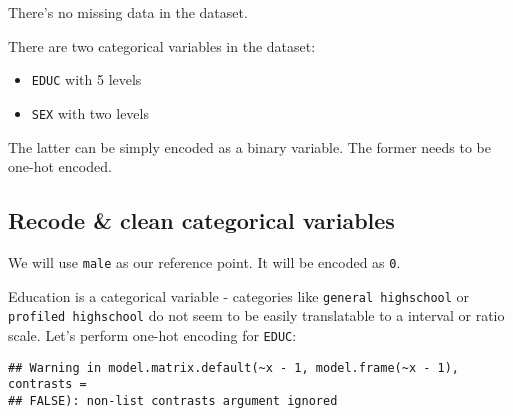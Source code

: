 \documentclass[]{article}
\newenvironment{Shaded}{\begin{snugshade}}{\end{snugshade}}
\newcommand{\CommentTok}[1]{\textcolor[rgb]{0.56,0.35,0.01}{\textit{#1}}}
\newcommand{\DataTypeTok}[1]{\textcolor[rgb]{0.13,0.29,0.53}{#1}}
\newcommand{\DecValTok}[1]{\textcolor[rgb]{0.00,0.00,0.81}{#1}}
\newcommand{\KeywordTok}[1]{\textcolor[rgb]{0.13,0.29,0.53}{\textbf{#1}}}
\newcommand{\NormalTok}[1]{#1}
\newcommand{\OperatorTok}[1]{\textcolor[rgb]{0.81,0.36,0.00}{\textbf{#1}}}
\newcommand{\StringTok}[1]{\textcolor[rgb]{0.31,0.60,0.02}{#1}}
\begin{document}
There's no missing data in the dataset.

There are two categorical variables in the dataset:

\begin{itemize}
\item
  \texttt{EDUC} with 5 levels
\item
  \texttt{SEX} with two levels
\end{itemize}

The latter can be simply encoded as a binary variable. The former needs
to be one-hot encoded.

\hypertarget{recode-clean-categorical-variables}{%
\subsection{Recode \& clean categorical
variables}\label{recode-clean-categorical-variables}}

We will use \texttt{male} as our reference point. It will be encoded as
\texttt{0}.

\begin{Shaded}
\end{Shaded}

Education is a categorical variable - categories like
\texttt{general\ highschool} or \texttt{profiled\ highschool} do not
seem to be easily translatable to a interval or ratio scale. Let's
perform one-hot encoding for \texttt{EDUC}:

\begin{Shaded}
\end{Shaded}

\begin{verbatim}
## Warning in model.matrix.default(~x - 1, model.frame(~x - 1), contrasts =
## FALSE): non-list contrasts argument ignored
\end{verbatim}
\end{document}
